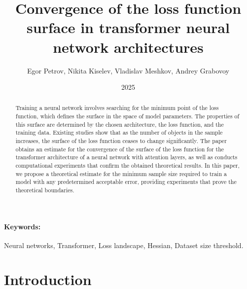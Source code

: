 \documentclass[12pt]{article}
\title{Convergence of the loss function surface in transformer neural network architectures}
\author{Egor Petrov, Nikita Kiselev, Vladislav Meshkov, Andrey Grabovoy}
\date{2025}
\begin{document}
\maketitle

\begin{abstract}
    Training a neural network involves searching for the minimum point of the loss function, which defines the surface in the space of model parameters. 
    The properties of this surface are determined by the chosen architecture, the loss function, and the training data. 
    Existing studies show that as the number of objects in the sample increases, the surface of the loss function ceases to change significantly. 
    The paper obtains an estimate for the convergence of the surface of the loss function for the transformer architecture of a neural network with attention layers, as well as conducts computational experiments that confirm the obtained theoretical results. 
    In this paper, we propose a theoretical estimate for the minimum sample size required to train a model with any predetermined acceptable error, providing experiments that prove the theoretical boundaries.

\end{abstract}
\paragraph{Keywords:} 
Neural networks, Transformer, Loss landscape, Hessian, Dataset size threshold.

\section{Introduction}



\end{document}
